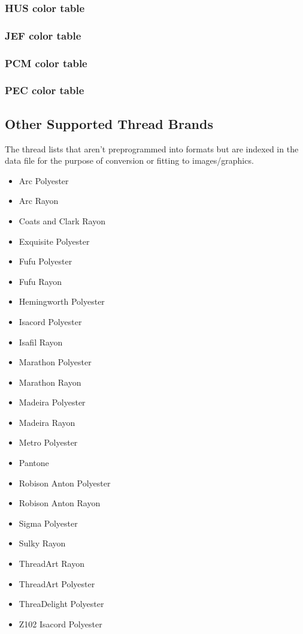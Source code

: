 \documentclass[a4paper, 11pt]{report}
\begin{document}
\subsubsection{HUS color table}

\subsubsection{JEF color table}

\subsubsection{PCM color table}

\subsubsection{PEC color table}

\subsection{Other Supported Thread Brands}

The thread lists that aren't preprogrammed into formats but
are indexed in the data file for the purpose of conversion
or fitting to images/graphics.

\begin{itemize}
\item Arc Polyester
\item Arc Rayon
\item Coats and Clark Rayon
\item Exquisite Polyester
\item Fufu Polyester
\item Fufu Rayon
\item Hemingworth Polyester
\item Isacord Polyester
\item Isafil Rayon
\item Marathon Polyester
\item Marathon Rayon
\item Madeira Polyester
\item Madeira Rayon
\item Metro Polyester
\item Pantone
\item Robison Anton Polyester
\item Robison Anton Rayon
\item Sigma Polyester
\item Sulky Rayon
\item ThreadArt Rayon
\item ThreadArt Polyester
\item ThreaDelight Polyester
\item Z102 Isacord Polyester
\end{itemize}
\end{document}
